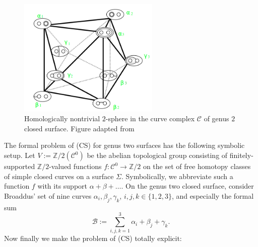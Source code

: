 \documentclass[12pt]{amsart}
\theoremstyle{definition}
\theoremstyle{remark}
\newcommand{\bZ}{\mathbb{Z}}
\newcommand{\sB}{\mathscr{B}}
\newcommand{\sC}{\mathscr{C}}
\begin{document}
\begin{figure}\label{br}
\centering
\includegraphics[width=0.6\textwidth]{broaddus-sphere-marked-new.png}
\caption{Homologically nontrivial $2$-sphere in the curve complex $\sC$ of genus $2$ closed surface. Figure adapted from \cite[Fig.10]{Broaddus2012}}
\end{figure}



The formal problem of (CS) for genus two surfaces has the following symbolic setup. Let $V:=\bZ/2(\sC^0)$ be the abelian topological group consisting of finitely-supported $\bZ/2$-valued functions $f: \sC^0 \to \bZ/2$ on the set of free homotopy classes of simple closed curves on a surface $\Sigma$. Symbolically, we abbreviate such a function $f$ with its support $\alpha+\beta+\ldots$. On the genus two closed surface, consider Broaddus' set of nine curves $\alpha_i, \beta_j, \gamma_k$, $i,j,k \in \{1,2,3\}$, and especially the formal sum $$\sB:= \sum_{i,j,k=1}^{3} \alpha_i+\beta_j+\gamma_k.$$ Now finally we make the problem of (CS) totally explicit: 
\end{document}
